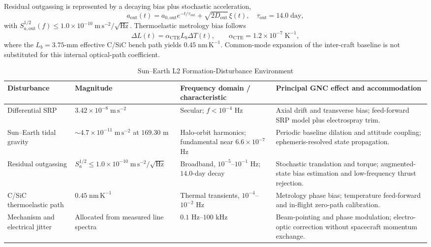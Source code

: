 \documentclass[10pt,twocolumn]{IEEEtran}
\begin{document}
Residual outgassing is represented by a decaying bias plus stochastic acceleration,
\begin{equation}
a_{\mathrm{out}}(t)=a_{0,\mathrm{out}}e^{-t/\tau_{\mathrm{out}}}
+\sqrt{2D_{\mathrm{out}}}\,\xi(t),
\quad
\tau_{\mathrm{out}}=14.0\;\mathrm{day},
\label{eq:outgassing_model}
\end{equation}
with $S_{a,\mathrm{out}}^{1/2}(f)\leq1.0\times10^{-10}\;\mathrm{m\,s^{-2}}/\sqrt{\mathrm{Hz}}$.  Thermoelastic metrology bias follows
\begin{equation}
\Delta L(t)=\alpha_{\mathrm{CTE}}L_b\Delta T(t),
\qquad
\alpha_{\mathrm{CTE}}=1.2\times10^{-7}\;\mathrm{K^{-1}},
\label{eq:thermoelastic_path}
\end{equation}
where the $L_b=3.75$-mm effective C/SiC bench path yields $0.45\;\mathrm{nm\,K^{-1}}$.  Common-mode expansion of the inter-craft baseline is not substituted for this internal optical-path coefficient.

\begin{table}[t]
\caption{Sun--Earth L2 Formation-Disturbance Environment}
\label{tab:l2_disturbances}
\centering
\footnotesize
\begin{tabular}{@{}p{3.05cm}p{3.25cm}p{3.25cm}p{6.0cm}@{}}
\toprule
Disturbance & Magnitude & Frequency domain / characteristic & Principal GNC effect and accommodation \\
\midrule
Differential SRP & $3.42\times10^{-8}\;\mathrm{m\,s^{-2}}$ & Secular; $f<10^{-4}$ Hz & Axial drift and transverse bias; feed-forward SRP model plus electrospray trim. \\
Sun--Earth tidal gravity & $\sim4.7\times10^{-11}\;\mathrm{m\,s^{-2}}$ at $169.30$ m & Halo-orbit harmonics; fundamental near $6.6\times10^{-7}$ Hz & Periodic baseline dilation and attitude coupling; ephemeris-resolved state propagation. \\
Residual outgassing & $S_a^{1/2}\leq1.0\times10^{-10}\;\mathrm{m\,s^{-2}}/\sqrt{\mathrm{Hz}}$ & Broadband, $10^{-5}$--$10^{-1}$ Hz; $14.0$-day decay & Stochastic translation and torque; augmented-state bias estimation and low-frequency thrust rejection. \\
C/SiC thermoelastic path & $0.45\;\mathrm{nm\,K^{-1}}$ & Thermal transients, $10^{-4}$--$10^{-2}$ Hz & Metrology phase bias; temperature feed-forward and in-flight zero-path calibration. \\
Mechanism and electrical jitter & Allocated from measured line spectra & $0.1$ Hz--$100$ kHz & Beam-pointing and phase modulation; electro-optic correction without spacecraft momentum exchange. \\
\bottomrule
\end{tabular}
\end{table}
\end{document}
